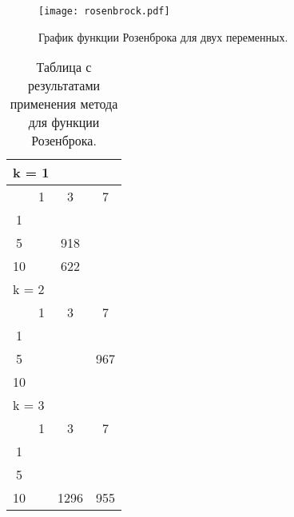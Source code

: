 \begin{figure}
    \centering
    \texttt{[image: rosenbrock.pdf]}
    \caption{График функции Розенброка для двух переменных.}
    \label{rosenbrock_plot}
\end{figure}

\begin{table}
  \centering
  \begin{tabular}{|*4{c|}}
    \hline
    \multicolumn{4}{|l|}{k = 1} \\
    \hline
    \diagbox{$\mu$}{$\lambda$} & \multicolumn{1}{c|}{1} & \multicolumn{1}{c|}{3} & \multicolumn{1}{c|}{7} \\
    \hline
    1 & \cellcolor{olive}{3631} & \cellcolor{olive}{1776} & \cellcolor{olive}{1226} \\
    \hline
    5 & \cellcolor{olive}{1666} & 918& \cellcolor{olive}{502} \\
    \hline
    10 & \cellcolor{olive}{1008} & 622& \cellcolor{olive}{358} \\
    \hline
    \multicolumn{4}{|l|}{k = 2} \\
    \hline
    \diagbox{$\mu$}{$\lambda$} & \multicolumn{1}{c|}{1} & \multicolumn{1}{c|}{3} & \multicolumn{1}{c|}{7} \\
    \hline
    1 & \cellcolor{olive}{4744}& \cellcolor{olive}{1839}& \cellcolor{olive}{1160} \\
    \hline
    5 & \cellcolor{olive}{2467}& \cellcolor{olive}{1128} & 967 \\
    \hline
    10 & \cellcolor{olive}{1722}& \cellcolor{olive}{988}& \cellcolor{olive}{615} \\
    \hline
    \multicolumn{4}{|l|}{k = 3} \\
    \hline
    \diagbox{$\mu$}{$\lambda$} & \multicolumn{1}{c|}{1} & \multicolumn{1}{c|}{3} & \multicolumn{1}{c|}{7} \\
    \hline
    1 & \cellcolor{olive}{5159}& \cellcolor{olive}{2821} & \cellcolor{olive}{1517} \\
    \hline
    5 & \cellcolor{olive}{2704} & \cellcolor{olive}{1544} & \cellcolor{olive}{902} \\
    \hline
    10 & \cellcolor{olive}{2048} & 1296 & 955 \\
  \hline
  \end{tabular}
  \captionsetup{justification=centering}
  \caption{Таблица с результатами применения метода  для функции Розенброка.}
  \label{adaptive_rosenbrock_results}
\end{table}

